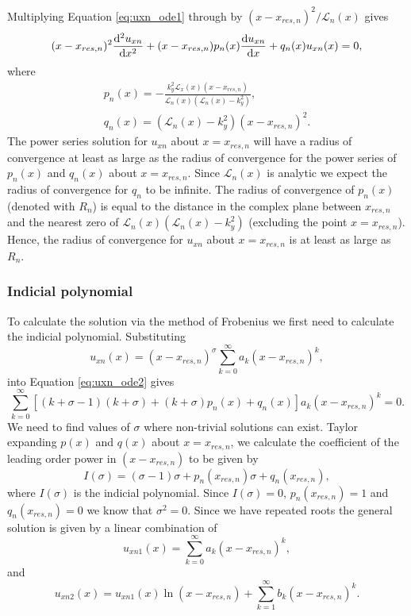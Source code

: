 Multiplying Equation \eqref{eq:uxn_ode1} through by $(x-x_{res,n})^2/\mathcal{L}_n(x)$ gives
\begin{equation}
    \label{eq:uxn_ode2}
    (x-x_{res,n})^2\dv[2]{u_{xn}}{x} + (x-x_{res,n})p_n(x)\dv{u_{xn}}{x} + q_n(x)u_{xn}(x)=0,
\end{equation}
where
\begin{gather}
    p_n(x) = -\frac{k_y^2\mathcal{L}_x(x)(x-x_{res,n})}{\mathcal{L}_n(x)(\mathcal{L}_n(x)-k_y^2)}, \\
    q_n(x) = (\mathcal{L}_n(x)-k_y^2)(x-x_{res,n})^2.
\end{gather}
The power series solution for $u_{xn}$ about $x=x_{res,n}$ will have a radius of convergence at least as large as the radius of convergence for the power series of $p_n(x)$ and $q_n(x)$ about $x=x_{res,n}$. Since $\mathcal{L}_n(x)$ is analytic we expect the radius of convergence for $q_n$ to be infinite. The radius of convergence of $p_n(x)$ (denoted with $R_n$) is equal to the distance in the complex plane between $x_{res,n}$ and the nearest zero of $\mathcal{L}_n(x)(\mathcal{L}_n(x)-k_y^2)$ (excluding the point $x=x_{res,n}$). Hence, the radius of convergence for $u_{xn}$ about $x=x_{res,n}$ is at least as large as $R_n$.

\subsubsection{Indicial polynomial}

To calculate the solution via the method of Frobenius we first need to calculate the indicial polynomial. Substituting
\[u_{xn}(x)=(x-x_{res,n})^\sigma\sum_{k=0}^\infty a_k(x-x_{res,n})^k,\]
into Equation \eqref{eq:uxn_ode2} gives
\[\sum_{k=0}^\infty [(k + \sigma - 1)(k+\sigma) + (k+\sigma)p_n(x) + q_n(x)]a_k(x-x_{res,n})^k=0.\]
We need to find values of $\sigma$ where non-trivial solutions can exist.
Taylor expanding $p(x)$ and $q(x)$ about $x=x_{res,n}$, we calculate the coefficient of the leading order power in $(x-x_{res,n})$ to be given by
\begin{equation}
    I(\sigma) = (\sigma-1)\sigma + p_n(x_{res,n})\sigma + q_n(x_{res,n}),
\end{equation}
where $I(\sigma)$ is the indicial polynomial. Since $I(\sigma)=0$, $p_n(x_{res,n})=1$ and $q_n(x_{res,n})=0$ we know that $\sigma^2=0$. Since we have repeated roots the general solution  is given by a linear combination of
\begin{equation}
    u_{xn1}(x) = \sum_{k=0}^\infty a_k(x-x_{res,n})^k,
\end{equation}
and
\begin{equation}
    u_{xn2}(x) = u_{xn1}(x)\ln(x-x_{res,n}) + \sum_{k=1}^\infty b_k(x-x_{res,n})^k.
\end{equation}

